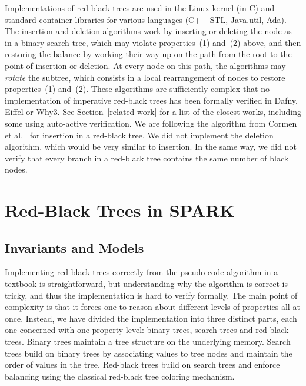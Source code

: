 \documentclass{llncs}
\newcommand{\spark}{SPARK\xspace}
\begin{document}
Implementations of red-black trees are used in the Linux kernel (in C) and
standard container libraries for various languages (C++ STL, Java.util,
Ada). The insertion and deletion algorithms work by inserting or deleting the
node as in a binary search tree, which may violate properties~(1) and~(2)
above, and then restoring the balance by working their way up on the path from
the root to the point of insertion or deletion. At every node on this path, the
algorithms may \emph{rotate} the subtree, which consists in a local
rearrangement of nodes to restore properties~(1) and~(2). These algorithms are
sufficiently complex that no implementation of imperative red-black trees has
been formally verified in Dafny, Eiffel or Why3. See
Section~\ref{related-work} for a list of the closest works, including some
using auto-active verification. We are following the algorithm from Cormen et
al.~\cite{Cormen2009} for insertion in a red-black tree. We did not implement
the deletion algorithm, which would be very similar to insertion. In the same
way, we did not verify that every branch in a red-black tree contains the same
number of black nodes.

\section{Red-Black Trees in \spark}
\subsection{Invariants and Models}
\label{sec-rbt-inv}


Implementing red-black trees correctly from the pseudo-code algorithm in a
textbook is straightforward, but understanding why the algorithm is correct is
tricky, and thus the implementation is hard to verify formally.
The main point of complexity is that it forces one to
reason about different levels of properties all at once. Instead, we have
divided the implementation into three distinct parts, each one concerned with
one property level: binary trees, search trees and red-black trees. Binary
trees maintain a tree structure on the underlying memory. Search trees build on
binary trees by associating values to tree nodes and maintain the order of
values in the tree. Red-black trees build on search trees and enforce balancing
using the classical red-black tree coloring mechanism.
\end{document}
